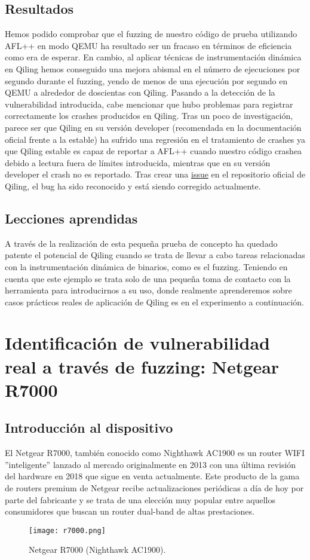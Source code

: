 \subsection{Resultados}
Hemos podido comprobar que el fuzzing de nuestro código de prueba utilizando AFL++ en modo QEMU ha resultado ser un fracaso en términos de 
eficiencia como era de esperar. En cambio,
al aplicar técnicas de instrumentación dinámica en Qiling hemos conseguido una mejora abismal en el número de ejecuciones por segundo durante el fuzzing, 
yendo de menos de una ejecución por segundo en QEMU a alrededor de doscientas con Qiling. Pasando a la detección de la vulnerabilidad introducida, 
cabe mencionar que hubo problemas para registrar correctamente los crashes producidos en Qiling. Tras un poco de investigación, parece ser que Qiling en su versión developer
(recomendada en la documentación oficial frente a la estable) ha sufrido una regresión en el tratamiento de crashes ya que Qiling estable es capaz de 
reportar a AFL++ cuando nuestro código crashea debido a lectura fuera de límites introducida, mientras que en su versión developer el crash no es reportado.
Tras crear una \href{https://github.com/qilingframework/qiling/issues/1163}{issue} en el repositorio oficial de Qiling\cite{qiling}, el bug ha sido reconocido y está siendo corregido actualmente.


\subsection{Lecciones aprendidas}
A través de la realización de esta pequeña prueba de concepto ha quedado patente el potencial de Qiling cuando se trata de llevar a cabo tareas relacionadas
con la instrumentación dinámica de binarios, como es el fuzzing. Teniendo en cuenta que este ejemplo se trata solo de una pequeña toma de contacto con la herramienta
para introducirnos a su uso, donde realmente aprenderemos sobre casos prácticos reales de aplicación de Qiling es en el experimento a continuación.

\section{Identificación de vulnerabilidad real a través de fuzzing: Netgear R7000}
\subsection{Introducción al dispositivo}
El Netgear R7000, también conocido como Nighthawk AC1900 es un router WIFI ''inteligente'' lanzado al mercado originalmente en 2013 con una última
revisión del hardware en 2018 que sigue en venta actualmente. Este producto de la gama de routers premium de Netgear recibe actualizaciones periódicas
a día de hoy por parte del fabricante y se trata de una elección muy popular entre aquellos consumidores que buscan un router dual-band de altas prestaciones. 
\begin{figure}[H]
    \centering
    \texttt{[image: r7000.png]}
    \caption{Netgear R7000 (Nighthawk AC1900).}
    \label{fig:r7000}
\end{figure}

